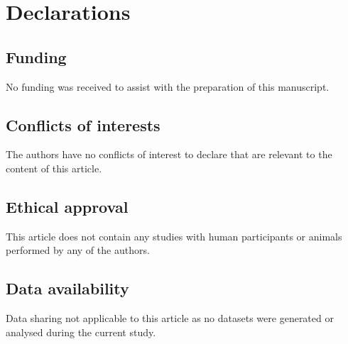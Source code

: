 \documentclass[3p]{elsarticle}
\begin{document}
\section*{Declarations}
\subsection*{Funding}
No funding was received to assist with the preparation of this manuscript.
\subsection*{Conflicts of interests}
The authors have no conflicts of interest to declare that are relevant to the content of this article.
\subsection*{Ethical approval}
This article does not contain any studies with human participants or animals performed by any of the authors.
\subsection*{Data availability}
Data sharing not applicable to this article as no datasets were generated or analysed during the current study.


\end{document}
